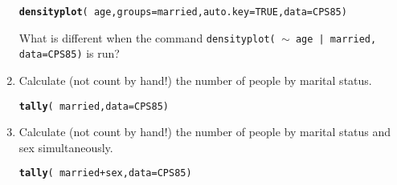 \documentclass[10pt]{article}\usepackage[]{graphicx}\usepackage[]{color}
\makeatletter
\newcommand{\hlnum}[1]{\textcolor[rgb]{0.686,0.059,0.569}{#1}}%
\newcommand{\hlopt}[1]{\textcolor[rgb]{0,0,0}{#1}}%
\newcommand{\hlstd}[1]{\textcolor[rgb]{0.345,0.345,0.345}{#1}}%
\newcommand{\hlkwc}[1]{\textcolor[rgb]{0.333,0.667,0.333}{#1}}%
\newcommand{\hlkwd}[1]{\textcolor[rgb]{0.737,0.353,0.396}{\textbf{#1}}}%
\newenvironment{kframe}{%
 \def\at@end@of@kframe{}%
 \ifinner\ifhmode%
  \def\at@end@of@kframe{\end{minipage}}%
  \begin{minipage}{\columnwidth}%
 \fi\fi%
 \def\FrameCommand##1{\hskip\@totalleftmargin \hskip-\fboxsep
 \colorbox{shadecolor}{##1}\hskip-\fboxsep
     \hskip-\linewidth \hskip-\@totalleftmargin \hskip\columnwidth}%
 \MakeFramed {\advance\hsize-\width
   \@totalleftmargin\z@ \linewidth\hsize
   \@setminipage}}%
 {\par\unskip\endMakeFramed%
 \at@end@of@kframe}
\newenvironment{knitrout}{}{} %
\makeatother
\begin{document}
\begin{enumerate}
\begin{knitrout}
\end{knitrout}

\begin{knitrout}
\color{fgcolor}\begin{kframe}
\begin{alltt}
\hlkwd{densityplot}\hlstd{(}\hlopt{~} \hlstd{age,} \hlkwc{groups}\hlstd{=married,} \hlkwc{auto.key}\hlstd{=}\hlnum{TRUE}\hlstd{,} \hlkwc{data}\hlstd{=CPS85)}
\end{alltt}
\end{kframe}
\end{knitrout}
What is different when the command {\tt densityplot( $\sim$ age | married, data=CPS85)} is run?

\item Calculate (not count by hand!) the number of people by marital status.

\begin{knitrout}
\color{fgcolor}\begin{kframe}
\begin{alltt}
\hlkwd{tally}\hlstd{(}\hlopt{~} \hlstd{married,} \hlkwc{data}\hlstd{=CPS85)}
\end{alltt}
\end{kframe}
\end{knitrout}

\item Calculate (not count by hand!) the number of people by marital status and sex simultaneously.


\begin{knitrout}
\color{fgcolor}\begin{kframe}
\begin{alltt}
\hlkwd{tally}\hlstd{(}\hlopt{~} \hlstd{married} \hlopt{+} \hlstd{sex,} \hlkwc{data}\hlstd{=CPS85)}
\end{alltt}
\end{kframe}
\end{knitrout}

\end{enumerate}
\end{document}
